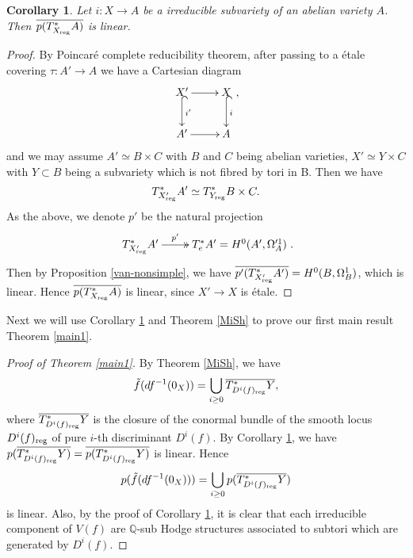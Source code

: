 \documentclass[a4paper,12pt,reqno]{amsart}
\theoremstyle{plain}
\newtheorem{corollary}[theorem]{Corollary}
\theoremstyle{remark}
\newcommand{\Q}{\mathbb Q}
\renewcommand{\cong}{\simeq}
\begin{document}
\begin{corollary}\label{Main-coro}
Let $i: X\to A$ be a irreducible subvariety of an abelian variety $A$. Then $\overline{p(T^*_{X_{\textnormal{reg}}}A)}$ is linear. 
\end{corollary}


\begin{proof}
By Poincar\'e complete reducibility theorem, after passing to a \'etale covering $\tau:A'\to A$ we have a Cartesian diagram 
$$\xymatrix{
X'\ar[r]\ar@{^{(}->}[d]^-{i'}& X\ar@{^{(}->}[d]^-{i}\\
A'\ar[r]& A},$$ and we may assume $A'\cong B\times C$ with $B$ and $C$ being abelian varieties, $X'\cong Y\times C$ with $Y\subset B$ being a subvariety which is not fibred by tori in B. Then we have $$T^*_{X'_{\textnormal{reg}}}A'\cong T^*_{Y_{\textnormal{reg}}}B\times C.$$ As the above, we denote $p'$ be the natural projection $$\xymatrix{
T^*_{X'_{\textnormal{reg}}}A'\ar@{->>}[r]^-{p'}& T^*_e A'=H^0(A', \Omega_A'^1)
}.$$  Then by Proposition \ref{van-nonsimple}, we have $\overline{p'(T^*_{X'_{\textnormal{reg}}}A')}=H^0(B, \Omega_B^1)$, which is linear. Hence $\overline{p(T^*_{X_{\textnormal{reg}}}A)}$ is linear, since $X'\to X$ is \'etale.
\end{proof}

Next we will use Corollary \ref{Main-coro} and Theorem \ref{MiSh} to prove our first main result Theorem \ref{main1}.

\begin{proof}[Proof of Theorem \ref{main1}]
By Theorem \ref{MiSh}, we have $$\tilde{f}(df^{-1}(0_X))=\bigcup_{i\geq0}\overline{T^*_{D^i(f)_{\textnormal{reg}}}Y},$$ where $\overline{T^*_{D^i(f)_{\textnormal{reg}}}Y}$ is the closure of the conormal bundle of the smooth locus $D^i(f)_{\textnormal{reg}}$ of pure $i$-th discriminant $D^i(f)$. By Corollary \ref{Main-coro}, we have $p(\overline{T^*_{D^i(f)_{\textnormal{reg}}}Y)}=\overline{p(T^*_{D^i(f)_{\textnormal{reg}}}Y)}$ is linear. Hence $$p(\tilde{f}(df^{-1}(0_X)))=\bigcup_{i\geq0}p(\overline{T^*_{D^i(f)_{\textnormal{reg}}}Y})$$ is linear. Also, by the proof of Corollary \ref{Main-coro}, it is clear that each irreducible component of $V(f)$ are $\Q$-sub Hodge structures associated to subtori which are generated by $D^i(f)$.
\end{proof}
\end{document}
